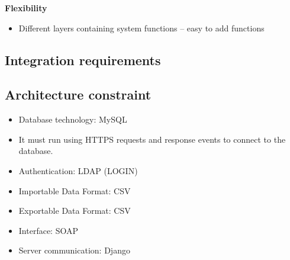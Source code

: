 \documentclass[10pt,a4paper]{article}
\begin{document}
\begin{center}\textbf{Flexibility}\end{center}           
        \begin{itemize}
                \item Different layers containing system functions – easy to add functions
        \end{itemize}   


\subsection{Integration requirements}

 
                
\subsection{Architecture constraint}
       \begin{itemize}
                \item Database technology: MySQL
        \end{itemize}
                \begin{itemize}
                        \item  It must run using HTTPS requests and response events to connect to the database.
                \end{itemize}
                \begin{itemize}
                        \item Authentication: LDAP (LOGIN)                 
                                \end{itemize}
                \begin{itemize}
                        \item Importable Data Format: CSV
                \end{itemize}
                \begin{itemize}
                        \item Exportable Data Format: CSV
                \end{itemize}
                \begin{itemize}
                        \item Interface: SOAP
                \end{itemize}
                \begin{itemize}
                        \item Server communication: Django
                \end{itemize}
\end{document}
